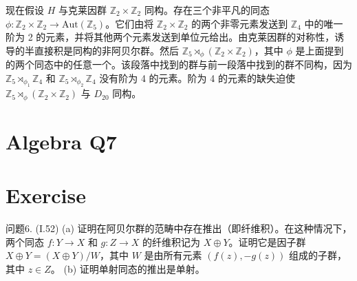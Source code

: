 \documentclass[12pt]{book}
\begin{document}
现在假设 $H$ 与克莱因群 $\mathbb{Z}_2 \times \mathbb{Z}_2$ 同构。存在三个非平凡的同态 $\phi: \mathbb{Z}_2 \times \mathbb{Z}_2 \to \text{Aut}(\mathbb{Z}_5)$。它们由将 $\mathbb{Z}_2 \times \mathbb{Z}_2$ 的两个非零元素发送到 $\mathbb{Z}_4$ 中的唯一阶为 2 的元素，并将其他两个元素发送到单位元给出。由克莱因群的对称性，诱导的半直接积是同构的非阿贝尔群。然后 $\mathbb{Z}_5 \rtimes_{\phi} (\mathbb{Z}_2 \times \mathbb{Z}_2)$，其中 $\phi$ 是上面提到的两个同态中的任意一个。该段落中找到的群与前一段落中找到的群不同构，因为 $\mathbb{Z}_5 \rtimes_{\phi_1} \mathbb{Z}_4$ 和 $\mathbb{Z}_5 \rtimes_{\phi_2} \mathbb{Z}_4$ 没有阶为 4 的元素。阶为 4 的元素的缺失迫使 $\mathbb{Z}_5 \rtimes_{\phi} (\mathbb{Z}_2 \times \mathbb{Z}_2)$ 与 $D_{20}$ 同构。
\newpage
\section{Algebra Q7}
\section*{Exercise}
问题6. (I.52) (a) 证明在阿贝尔群的范畴中存在推出（即纤维积）。在这种情况下，两个同态 $f: Y \to X$ 和 $g: Z \to X$ 的纤维积记为 $X \oplus Y$。证明它是因子群 $X \oplus Y = (X \oplus Y) / W$，其中 $W$ 是由所有元素 $(f(z), -g(z))$ 组成的子群，其中 $z \in Z$。 (b) 证明单射同态的推出是单射。
\end{document}
